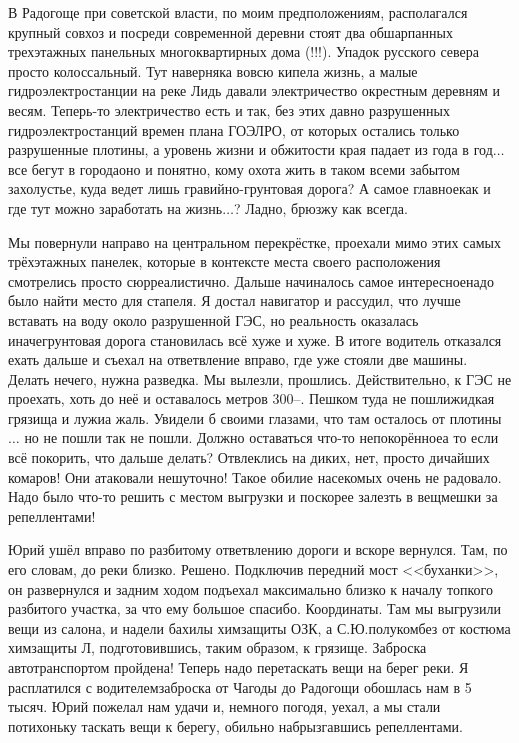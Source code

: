 В Радогоще при советской власти, по моим предположениям, располагался крупный совхоз и посреди современной деревни стоят два обшарпанных трехэтажных панельных многоквартирных дома (!!!). Упадок русского севера просто колоссальный. Тут наверняка вовсю кипела жизнь, а малые гидроэлектростанции на реке Лидь давали электричество окрестным деревням и весям. Теперь-то электричество есть и так, без этих давно разрушенных гидроэлектростанций времен плана ГОЭЛРО, от которых остались только разрушенные плотины, а уровень жизни и обжитости края падает из года в год$\ldots$ все бегут в города\mdash оно и понятно, кому охота жить в таком всеми забытом захолустье, куда ведет лишь гравийно-грунтовая дорога? А самое главное\mdash как и где тут можно заработать на жизнь$\ldots$? Ладно, брюзжу как всегда. 

Мы повернули направо на центральном перекрёстке, проехали мимо этих самых трёхэтажных панелек, которые в контексте места своего расположения смотрелись просто сюрреалистично. Дальше начиналось самое интересное\mdash надо было найти место для стапеля. Я достал навигатор и рассудил, что лучше вставать на воду около разрушенной ГЭС, но реальность оказалась иначе\mdash грунтовая дорога становилась всё хуже и хуже. В итоге водитель отказался ехать дальше и съехал на ответвление вправо, где уже стояли две машины. Делать нечего, нужна разведка. Мы вылезли, прошлись. Действительно, к ГЭС не проехать, хоть до неё и оставалось метров 300\thinspace\nobreakdash--. Пешком туда не пошли\mdash жидкая грязища и лужи\mdash а жаль. Увидели б своими глазами, что там осталось от плотины$\ldots$ но не пошли так не пошли. Должно оставаться что-то непокорённое\mdash а то если всё покорить, что дальше делать? Отвлеклись на диких, нет, просто дичайших комаров! Они атаковали нешуточно! Такое обилие насекомых очень не радовало. Надо было что-то решить с местом выгрузки и поскорее залезть в вещмешки за репеллентами!

Юрий ушёл вправо по разбитому ответвлению дороги и вскоре вернулся. Там, по его словам, до реки близко. Решено. Подключив передний мост <<буханки>>, он развернулся и задним ходом подъехал максимально близко к началу топкого разбитого участка, за что ему большое спасибо. Координаты\mdash \CoordsLidSeventeenStapel. Там мы выгрузили вещи из салона, и надели бахилы химзащиты ОЗК, а С.Ю.\mdash полукомбез от костюма химзащиты Л, подготовившись, таким образом, к грязище. Заброска автотранспортом пройдена! Теперь надо перетаскать вещи на берег реки. Я расплатился с водителем\mdash заброска от Чагоды до Радогощи обошлась нам в 5 тысяч. Юрий пожелал нам удачи и, немного погодя, уехал, а мы стали потихоньку таскать вещи к берегу, обильно набрызгавшись репеллентами.

